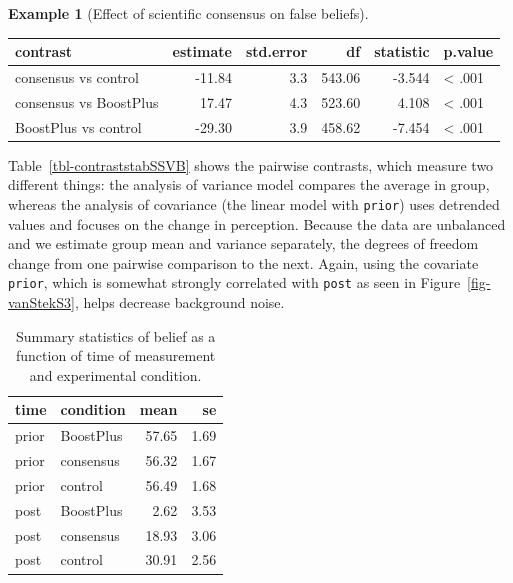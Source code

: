 \documentclass[
  11pt,
  letterpaper,
]{scrbook}
\theoremstyle{definition}
\newtheorem{example}{Example}[chapter]
\theoremstyle{remark}
\begin{document}
\begin{example}[Effect of scientific consensus on false
beliefs]
\begin{table}
\begin{minipage}[t]{\linewidth}
{}

\end{minipage}%
\newline
\begin{minipage}[t]{\linewidth}

{\centering 

\centering
\begin{tabular}[t]{lrrrrl}
\toprule
contrast & estimate & std.error & df & statistic & p.value\\
\midrule
consensus vs control & -11.84 & 3.3 & 543.06 & -3.544 & < .001\\
consensus vs BoostPlus & 17.47 & 4.3 & 523.60 & 4.108 & < .001\\
BoostPlus vs control & -29.30 & 3.9 & 458.62 & -7.454 & < .001\\
\bottomrule
\end{tabular}

}

\end{minipage}%

\end{table}

Table~\ref{tbl-contraststabSSVB} shows the pairwise contrasts, which
measure two different things: the analysis of variance model compares
the average in group, whereas the analysis of covariance (the linear
model with \texttt{prior}) uses detrended values and focuses on the
change in perception. Because the data are unbalanced and we estimate
group mean and variance separately, the degrees of freedom change from
one pairwise comparison to the next. Again, using the covariate
\texttt{prior}, which is somewhat strongly correlated with \texttt{post}
as seen in Figure~\ref{fig-vanStekS3}, helps decrease background noise.

\hypertarget{tbl-vanStekS3}{}
\begin{table}
\caption{\label{tbl-vanStekS3}Summary statistics of belief as a function of time of measurement and
experimental condition. }\tabularnewline

\centering
\begin{tabular}{llrr}
\toprule
time & condition & mean & se\\
\midrule
prior & BoostPlus & 57.65 & 1.69\\
prior & consensus & 56.32 & 1.67\\
prior & control & 56.49 & 1.68\\
post & BoostPlus & 2.62 & 3.53\\
post & consensus & 18.93 & 3.06\\
post & control & 30.91 & 2.56\\
\bottomrule
\end{tabular}
\end{table}


\end{example}
\end{document}
